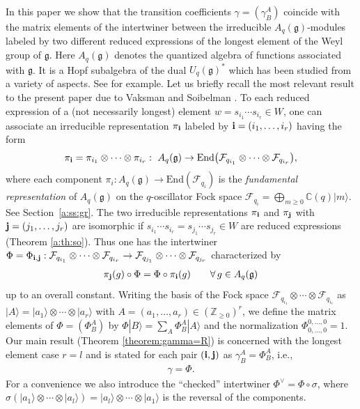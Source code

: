 \documentclass[pdftex]{sigma}
\newcommand{\geh}{\mathfrak{g}}
\newcommand{\Z}{{\mathbb Z}}
\newcommand{\C}{{\mathbb C}}
\begin{document}
In this paper we show that the transition coef\/f\/icients
$\gamma=(\gamma^A_B)$ coincide with
the matrix elements of the intertwiner between the irreducible $A_q(\geh)$-modules labeled by two dif\/ferent reduced expressions of the longest element of the Weyl group of $\geh$.
Here $A_q(\geh)$ denotes the quantized algebra of functions  associated with
$\geh$.
It is a Hopf subalgebra of the dual $U_q(\geh)^\ast$
which has been studied from a variety of aspects.
See \cite{D86,Kas93,NYM,RTF,So1,So2,VS} for example.
Let us brief\/ly recall the most relevant result to the present paper
due to Vaksman and Soibelman \cite{So1,So2,VS}.
To each reduced expression of a (not necessarily longest) element
$w = s_{i_1}\cdots s_{i_r} \in W$,
one can associate an irreducible representation
$\pi_{\bf i}$
labeled by ${\bf i}=(i_1,\ldots, i_r)$ having the form
\begin{gather*}
\pi_{\bf i}= \pi_{i_1}\otimes \cdots \otimes \pi_{i_r}: \
A_q(\geh) \rightarrow
\mathrm{End}\big(\mathcal{F}_{q_{i_1}} \otimes \cdots \otimes
\mathcal{F}_{q_{i_r}}\big),
\end{gather*}
where each component
$\pi_i: A_q(\geh) \rightarrow \mathrm{End}(\mathcal{F}_{q_i})$ is the
{\em fundamental representation} of $A_q(\geh)$ on
the $q$-oscillator Fock space
$\mathcal{F}_{q_i} = \bigoplus_{m\ge 0}\C(q)|m\rangle$.
See Section~\ref{a:ss:gr}.
The two irreducible representations $\pi_{\bf i}$ and
$\pi_{\bf j}$ with ${\bf j}=(j_1,\ldots, j_r)$
are isomorphic if
$s_{i_1}\cdots s_{i_r}=s_{j_1}\cdots s_{j_r} \in W$
are reduced expressions (Theorem \ref{a:th:so}).
Thus one has the intertwiner
$\Phi = \Phi_{{\bf i}, {\bf j}}:
\mathcal{F}_{q_{i_1}}\otimes \cdots \otimes \mathcal{F}_{q_{i_r}}
\rightarrow
\mathcal{F}_{q_{j_1}}\otimes \cdots \otimes \mathcal{F}_{q_{j_r}}$
characterized by
\begin{gather*}
\pi_{\bf j}(g)\circ \Phi = \Phi \circ \pi_{\bf i}(g)\qquad
\forall \, g \in A_q(\mathfrak{g})
\end{gather*}
up to an overall constant.
Writing the basis of the Fock space
$\mathcal{F}_{q_{i_1}} \otimes \cdots \otimes
\mathcal{F}_{q_{i_r}}$ as
$|A\rangle = |a_1\rangle \otimes \cdots \otimes |a_r\rangle$
with $A=(a_1, \ldots, a_r) \in (\Z_{\ge 0})^r$,
we def\/ine the matrix elements of $\Phi=(\Phi^A_B)$ by
$\Phi |B\rangle = \sum_A \Phi^A_B |A\rangle$ and the
normalization $\Phi^{0,\ldots, 0}_{0,\ldots, 0}=1$.
Our main result (Theorem \ref{theorem:gamma=R})
is concerned with the longest element case $r=l$
and is stated for each pair $({\bf i}, {\bf j})$ as $\gamma^A_B = \Phi^A_B$, i.e.,
\begin{gather}\label{a:main}
\gamma= \Phi.
\end{gather}
For a convenience we also introduce the ``checked'' intertwiner
$\Phi^{\vee} = \Phi \circ \sigma$, where
$\sigma  (|a_1\rangle \otimes \cdots \otimes |a_l\rangle) =
 |a_l\rangle \otimes \cdots \otimes |a_1 \rangle$
is the reversal of the components.
\end{document}
